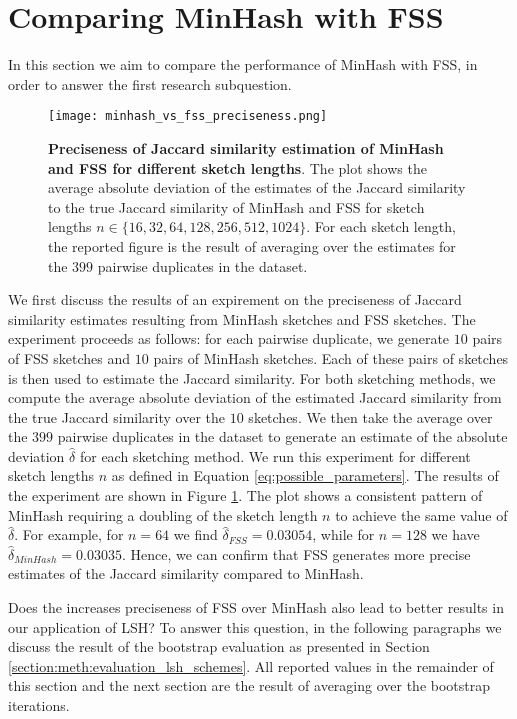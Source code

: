 \section{Comparing MinHash with FSS}
\label{section:results:MinHash_vs_FSS}

In this section we aim to compare the performance of MinHash with FSS, in order to answer the first research subquestion. 
\begin{figure}
    \centering
    \texttt{[image: minhash\_vs\_fss\_preciseness.png]}
    \caption[Preciseness of Jaccard similarity estimation of MinHash and FSS for different sketch lengths]{\textbf{Preciseness of Jaccard similarity estimation of MinHash and FSS for different sketch lengths}. The plot shows the average absolute deviation of the estimates of the Jaccard similarity to the true Jaccard similarity of MinHash and FSS for sketch lengths $n\in\{16,32,64,128,256,512,1024\}$. For each sketch length, the reported figure is the result of averaging over the estimates for the $399$ pairwise duplicates in the dataset.}
    \label{fig:minhash_vs_fss_jaccard_estimation_preciseness}
\end{figure}

We first discuss the results of an expirement on the preciseness of Jaccard similarity estimates resulting from MinHash sketches and FSS sketches. The experiment proceeds as follows: for each pairwise duplicate, we generate $10$ pairs of FSS sketches and $10$ pairs of MinHash sketches. Each of these pairs of sketches is then used to estimate the Jaccard similarity. For both sketching methods, we compute the average absolute deviation of the estimated Jaccard similarity from the true Jaccard similarity over the $10$ sketches. We then take the average over the $399$ pairwise duplicates in the dataset to generate an estimate of the absolute deviation $\hat{\delta}$ for each sketching method. We run this experiment for different sketch lengths $n$ as defined in Equation \ref{eq:possible_parameters}. The results of the experiment are shown in Figure \ref{fig:minhash_vs_fss_jaccard_estimation_preciseness}. The plot shows a consistent pattern of MinHash requiring a doubling of the sketch length $n$ to achieve the same value of $\hat{\delta}$. For example, for $n=64$ we find $\hat{\delta}_{FSS} = 0.03054$, while for $n=128$ we have $\hat{\delta}_{MinHash} = 0.03035$. Hence, we can confirm that FSS generates more precise estimates of the Jaccard similarity compared to MinHash. 

Does the increases preciseness of FSS over MinHash also lead to better results in our application of LSH? To answer this question, in the following paragraphs we discuss the result of the bootstrap evaluation as presented in Section \ref{section:meth:evaluation_lsh_schemes}. All reported values in the remainder of this section and the next section are the result of averaging over the bootstrap iterations. 

